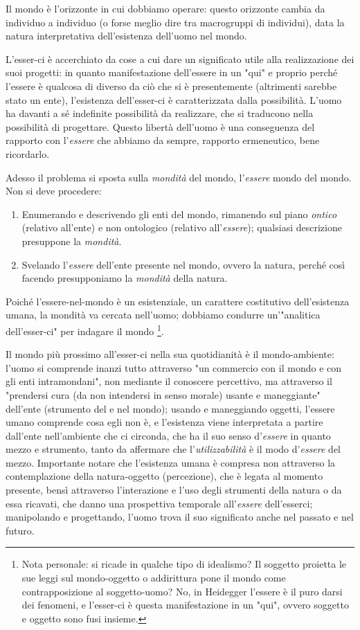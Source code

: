 \documentclass[a4paper,12pt,oneside]{article}%
\begin{document}
Il mondo è l'orizzonte in cui dobbiamo operare: questo orizzonte cambia da individuo a individuo (o forse meglio dire tra macrogruppi di individui), data la natura interpretativa dell'esistenza dell'uomo nel mondo.

L’esser-ci è accerchiato da cose a cui dare un significato utile alla realizzazione dei suoi progetti:  in quanto manifestazione dell'essere in un "qui" e proprio perché l'essere è qualcosa di diverso da ciò che si è presentemente (altrimenti sarebbe stato un ente), l’esistenza dell’esser-ci è caratterizzata dalla possibilità. L’uomo ha davanti a sé indefinite possibilità da realizzare, che si traducono nella possibilità di progettare. Questo libertà dell'uomo è una conseguenza del rapporto con l'\textit{essere} che abbiamo da sempre, rapporto ermeneutico, bene ricordarlo.

Adesso il problema si sposta sulla \textit{mondità} del mondo, l'\textit{essere} mondo del mondo. Non si deve procedere:

\begin{enumerate}
	\item Enumerando e descrivendo gli enti del mondo, rimanendo sul piano \textit{ontico} (relativo all'ente) e non ontologico (relativo all'\textit{essere}); qualsiasi descrizione presuppone la \textit{mondità}.
	\item Svelando l'\textit{essere} dell'ente presente nel mondo, ovvero la natura, perché così facendo presupponiamo la \textit{mondità} della natura.
\end{enumerate}

Poiché l'essere-nel-mondo è un esistenziale, un carattere costitutivo dell'esistenza umana, la mondità va cercata nell'uomo; dobbiamo condurre un'"analitica dell'esser-ci" per indagare il mondo \footnote{Nota personale: si ricade in qualche tipo di idealismo? Il soggetto proietta le sue leggi sul mondo-oggetto o addirittura pone il mondo come contrapposizione al soggetto-uomo? No, in Heidegger l'essere è il puro darsi dei fenomeni, e l'esser-ci è questa manifestazione in un "qui", ovvero soggetto e oggetto sono fusi insieme.}.
	
Il mondo più prossimo all'esser-ci nella sua quotidianità è il mondo-ambiente: l'uomo si comprende inanzi tutto attraverso "un commercio con il mondo e con gli enti intramondani", non mediante il conoscere percettivo, ma attraverso il "prendersi cura (da non intendersi in senso morale) usante e maneggiante" dell'ente (strumento del e nel mondo); usando e maneggiando oggetti, l'essere umano comprende cosa egli non è, e l'esistenza viene interpretata a partire dall'ente nell'ambiente che ci circonda, che ha il suo senso d'\textit{essere} in quanto mezzo e strumento, tanto da affermare che l'\textit{utilizzabilità} è il modo d'\textit{essere} del mezzo. Importante notare che l'esistenza umana è compresa non attraverso la contemplazione della natura-oggetto (percezione), che è legata al momento presente, bensì attraverso l'interazione e l'uso degli strumenti della natura o da essa ricavati, che danno una prospettiva temporale all'\textit{essere} dell'esserci; manipolando e progettando, l'uomo trova il suo significato anche nel passato e nel futuro.
\end{document}
